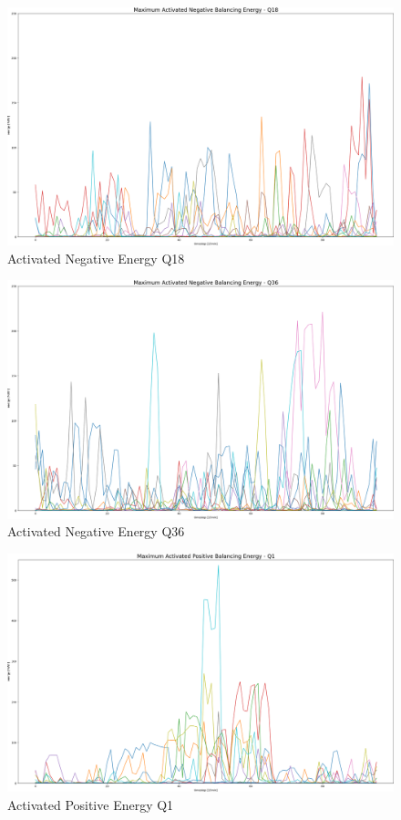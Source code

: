 \begin{figure}[H]
	\centering
	\includegraphics[width=1\linewidth]{pictures/results/Activated_negEnergy_Q18.png}
	\caption{Activated Negative Energy Q18}
	\label{fig:_negEnergy_Q18}
\end{figure}

\begin{figure}[H]
	\centering
	\includegraphics[width=1\linewidth]{pictures/results/Activated_negEnergy_Q36.png}
	\caption{Activated Negative Energy Q36}
	\label{fig:_negEnergy_Q36}
\end{figure}
\begin{figure}
	\includegraphics[width=1\linewidth]{pictures/results/Activated_posEnergy_Q1.png}
	\caption{Activated Positive Energy Q1}
	\label{fig:_posEnergy_Q1}
\end{figure}

